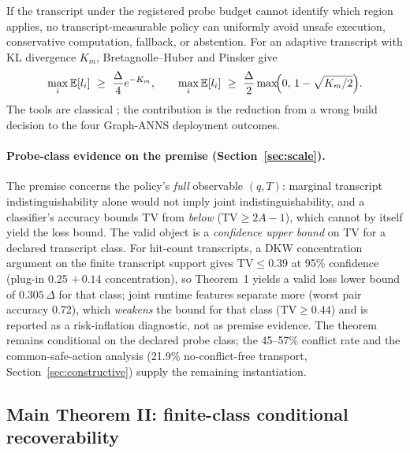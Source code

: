 \documentclass{article}
\newcommand{\TV}{\mathrm{TV}}
\newcommand{\E}{\mathbb{E}}
\begin{document}
If the transcript under the registered probe budget cannot identify which region applies, no
transcript-measurable policy can uniformly avoid unsafe execution, conservative computation, fallback, or
abstention. For an adaptive transcript with KL divergence $K_m$, Bretagnolle--Huber and Pinsker give
\begin{equation}
\max_{i}\E[l_{i}]\ \ge\ \frac{\Delta}{4}e^{-K_{m}},\qquad
\max_{i}\E[l_{i}]\ \ge\ \frac{\Delta}{2}\max\!\Bigl(0,\,1-\sqrt{K_{m}/2}\Bigr).
\label{eq:bh}
\end{equation}
The tools are classical \citep{yu1997assouad}; the contribution is the reduction from a wrong build
decision to the four Graph-ANNS deployment outcomes.

\paragraph{Probe-class evidence on the premise (Section~\ref{sec:scale}).}
The premise concerns the policy's \emph{full} observable $(q,T)$: marginal transcript indistinguishability
alone would not imply joint indistinguishability, and a classifier's accuracy bounds TV from
\emph{below} ($\TV\ge 2A{-}1$), which cannot by itself yield the loss bound. The valid object is a
\emph{confidence upper bound} on TV for a declared transcript class. For hit-count transcripts, a DKW
concentration argument on the finite transcript support gives $\TV\le0.39$ at 95\% confidence
(plug-in 0.25 $+\,0.14$ concentration), so Theorem~1 yields a valid loss lower bound of
$0.305\,\Delta$ for that class; joint runtime features separate more (worst pair accuracy 0.72), which
\emph{weakens} the bound for that class ($\TV\ge0.44$) and is reported as a risk-inflation diagnostic,
not as premise evidence. The theorem remains conditional on the declared probe class; the 45--57\% conflict rate and the
common-safe-action analysis (21.9\% no-conflict-free transport, Section~\ref{sec:constructive}) supply
the remaining instantiation.

\subsection{Main Theorem II: finite-class conditional recoverability}
\end{document}

